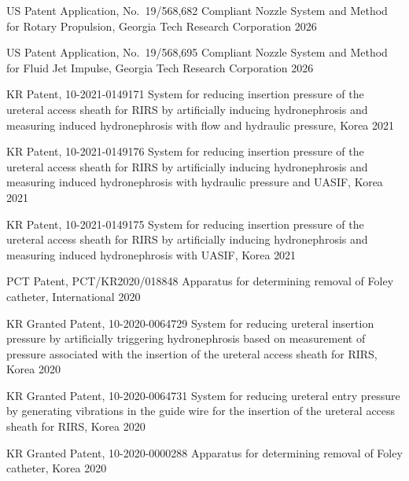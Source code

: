 
\begin{cvhonors}

  \cvhonor
    {US Patent Application, No.\ 19/568,682}
    {Compliant Nozzle System and Method for Rotary Propulsion, Georgia Tech Research Corporation}
    {}
    {2026}

  \cvhonor
    {US Patent Application, No.\ 19/568,695}
    {Compliant Nozzle System and Method for Fluid Jet Impulse, Georgia Tech Research Corporation}
    {}
    {2026}

  \cvhonor
    {KR Patent, 10-2021-0149171}
    {System for reducing insertion pressure of the ureteral access sheath for RIRS
     by artificially inducing hydronephrosis and measuring induced hydronephrosis
     with flow and hydraulic pressure, Korea}
    {}
    {2021}

  \cvhonor
    {KR Patent, 10-2021-0149176}
    {System for reducing insertion pressure of the ureteral access sheath for RIRS
     by artificially inducing hydronephrosis and measuring induced hydronephrosis
     with hydraulic pressure and UASIF, Korea}
    {}
    {2021}

  \cvhonor
    {KR Patent, 10-2021-0149175}
    {System for reducing insertion pressure of the ureteral access sheath for RIRS
     by artificially inducing hydronephrosis and measuring induced hydronephrosis
     with UASIF, Korea}
    {}
    {2021}

  \cvhonor
    {PCT Patent, PCT/KR2020/018848}
    {Apparatus for determining removal of Foley catheter, International}
    {}
    {2020}

  \cvhonor
    {KR Granted Patent, 10-2020-0064729}
    {System for reducing ureteral insertion pressure by artificially triggering
     hydronephrosis based on measurement of pressure associated with the insertion
     of the ureteral access sheath for RIRS, Korea}
    {}
    {2020}

  \cvhonor
    {KR Granted Patent, 10-2020-0064731}
    {System for reducing ureteral entry pressure by generating vibrations in the
     guide wire for the insertion of the ureteral access sheath for RIRS, Korea}
    {}
    {2020}

  \cvhonor
    {KR Granted Patent, 10-2020-0000288}
    {Apparatus for determining removal of Foley catheter, Korea}
    {}
    {2020}

\end{cvhonors}
